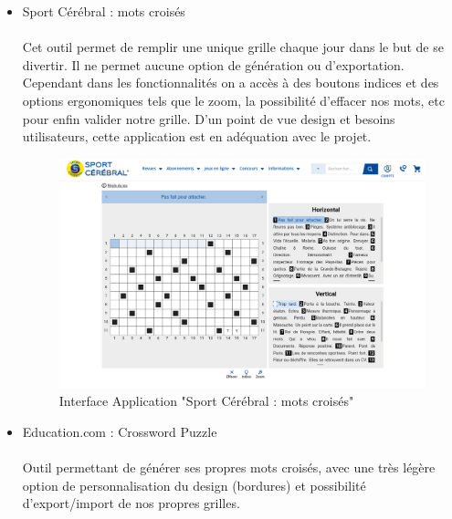 \documentclass [ 11 pt ] {article}
\begin{document}
\begin{itemize}
        \item Sport Cérébral : mots croisés \cite{McG}
        \\
        \\ Cet outil permet de remplir une unique grille chaque jour dans le but de se divertir. Il ne permet aucune option de génération ou d’exportation. Cependant dans les fonctionnalités on a accès à des boutons indices et des options ergonomiques tels que le zoom, la possibilité d’effacer nos mots, etc pour enfin valider notre grille. D’un point de vue design et besoins utilisateurs, cette application est en adéquation avec le projet.
        
        \begin{center}
            \begin{figure}[H]
                \begin{center}
                    \includegraphics[scale=0.35]{sportcerebral.png}
                    \caption{Interface Application "Sport Cérébral : mots croisés" }
                    \label{Pres}
                \end{center}
            \end{figure}
        \end{center}
        
        \newpage
        \item Education.com : Crossword Puzzle \cite{Cp}
        \\
        \\ Outil permettant de générer ses propres mots croisés, avec une très légère option de personnalisation du design (bordures) et possibilité d’export/import de nos propres grilles.
        

\end{itemize}
\end{document}
